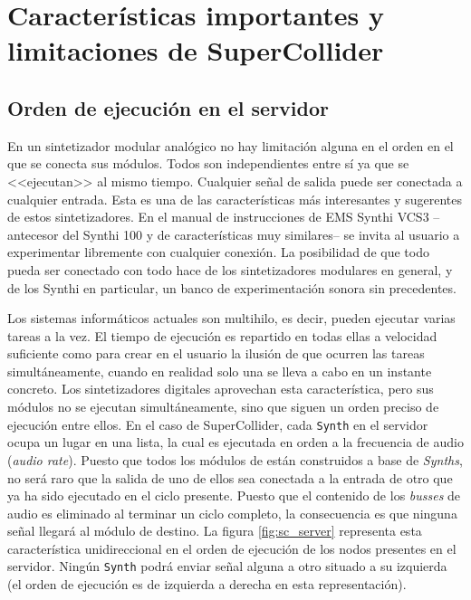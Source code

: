 \section[Características de SuperCollider]{Características importantes y limitaciones de SuperCollider}
\label{sec:sc_features}

\subsection{Orden de ejecución en el servidor}
En un sintetizador modular analógico no hay limitación alguna en el orden en el que se conecta sus módulos. Todos son independientes entre sí ya que se <<ejecutan>> al mismo tiempo. Cualquier señal de salida puede ser conectada a cualquier entrada. Esta es una de las características más interesantes y sugerentes de estos sintetizadores. En el manual de instrucciones de EMS Synthi VCS3 --antecesor del Synthi 100 y de características muy similares-- se invita al usuario a experimentar libremente con cualquier conexión. La posibilidad de que todo pueda ser conectado con todo hace de los sintetizadores modulares en general, y de los Synthi en particular, un banco de experimentación sonora sin precedentes.

Los sistemas informáticos actuales son multihilo, es decir, pueden ejecutar varias tareas a la vez. El tiempo de ejecución es repartido en todas ellas a velocidad suficiente como para crear en el usuario la ilusión de que ocurren las tareas simultáneamente, cuando en realidad solo una se lleva a cabo en un instante concreto. Los sintetizadores digitales aprovechan esta característica, pero sus módulos no se ejecutan simultáneamente, sino que siguen un orden preciso de ejecución entre ellos. En el caso de SuperCollider, cada \texttt{Synth} en el servidor ocupa un lugar en una lista, la cual es ejecutada en orden a la frecuencia de audio (\textit{audio rate}). Puesto que todos los módulos de \appName están construidos a base de \textit{Synths}, no será raro que la salida de uno de ellos sea conectada a la entrada de otro que ya ha sido ejecutado en el ciclo presente. Puesto que el contenido de los \textit{busses} de audio es eliminado al terminar un ciclo completo, la consecuencia es que ninguna señal llegará al módulo de destino. La figura \ref{fig:sc_server} representa esta característica unidireccional en el orden de ejecución de los nodos presentes en el servidor. Ningún \texttt{Synth} podrá enviar señal alguna a otro situado a su izquierda (el orden de ejecución es de izquierda a derecha en esta representación).

